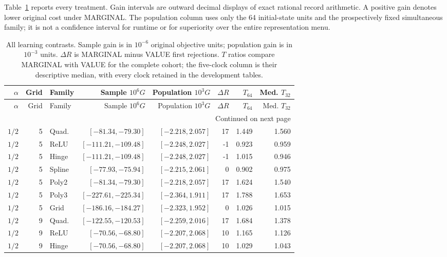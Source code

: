 Table~\ref{tab:learninggains121} reports every treatment. Gain intervals are outward decimal displays of exact rational record arithmetic. A positive gain denotes lower original cost under MARGINAL. The population column uses only the 64 initial-state units and the prospectively fixed simultaneous family; it is not a confidence interval for runtime or for superiority over the entire representation menu.

\begingroup
\small\setlength{\tabcolsep}{3pt}
\begin{longtable}{rrlrrrrr}
\caption{All learning contrasts. Sample gain is in $10^{-6}$ original objective units; population gain is in $10^{-3}$ units. $\Delta R$ is MARGINAL minus VALUE first rejections. $T$ ratios compare MARGINAL with VALUE for the complete cohort; the five-clock column is their descriptive median, with every clock retained in the development tables.}\label{tab:learninggains121}\\
\toprule
$\alpha$ & Grid & Family & Sample $10^6G$ & Population $10^3G$ & $\Delta R$ & $T_{64}$ & Med. $T_{32}$\\
\midrule\endfirsthead
\toprule
$\alpha$ & Grid & Family & Sample $10^6G$ & Population $10^3G$ & $\Delta R$ & $T_{64}$ & Med. $T_{32}$\\
\midrule\endhead
\midrule\multicolumn{8}{r}{Continued on next page}\\\endfoot
\bottomrule\endlastfoot
$1/2$ & 5 & Quad. & $[-81.34,-79.30]$ & $[-2.218,2.057]$ & 17 & 1.449 & 1.560\\
$1/2$ & 5 & ReLU & $[-111.21,-109.48]$ & $[-2.248,2.027]$ & -1 & 0.923 & 0.959\\
$1/2$ & 5 & Hinge & $[-111.21,-109.48]$ & $[-2.248,2.027]$ & -1 & 1.015 & 0.946\\
$1/2$ & 5 & Spline & $[-77.93,-75.94]$ & $[-2.215,2.061]$ & 0 & 0.902 & 0.975\\
$1/2$ & 5 & Poly2 & $[-81.34,-79.30]$ & $[-2.218,2.057]$ & 17 & 1.624 & 1.540\\
$1/2$ & 5 & Poly3 & $[-227.61,-225.34]$ & $[-2.364,1.911]$ & 17 & 1.788 & 1.653\\
$1/2$ & 5 & Grid & $[-186.16,-184.27]$ & $[-2.323,1.952]$ & 0 & 1.026 & 1.015\\
$1/2$ & 9 & Quad. & $[-122.55,-120.53]$ & $[-2.259,2.016]$ & 17 & 1.684 & 1.378\\
$1/2$ & 9 & ReLU & $[-70.56,-68.80]$ & $[-2.207,2.068]$ & 10 & 1.165 & 1.126\\
$1/2$ & 9 & Hinge & $[-70.56,-68.80]$ & $[-2.207,2.068]$ & 10 & 1.029 & 1.043\\

\end{longtable}
